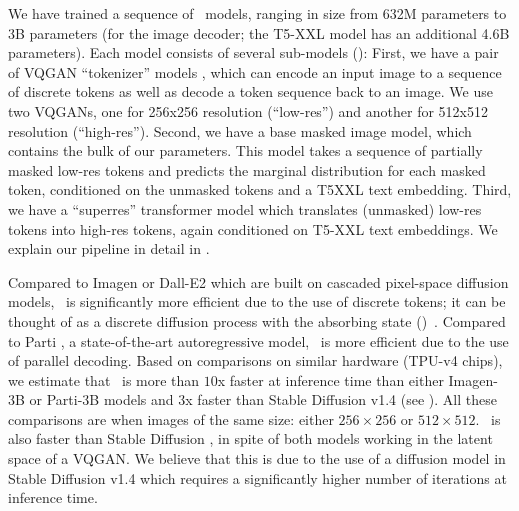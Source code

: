 We have trained a sequence of \name~models, ranging in size from 632M parameters to 3B parameters (for the image decoder; the T5-XXL model has an additional 4.6B parameters). Each model consists of several sub-models ():
First, we have a pair of VQGAN ``tokenizer'' models \citep{esser2021taming}, which can encode an input image to a sequence of discrete tokens as well as decode a token sequence back to an image. We use two VQGANs, one for 256x256 resolution (``low-res'') and another for 512x512 resolution (``high-res''). Second, we have a base masked image model, which contains the bulk of our parameters. This model takes a sequence of partially masked low-res tokens and predicts the marginal distribution for each masked token, conditioned on the unmasked tokens and a T5XXL text embedding. Third, we have a ``superres'' transformer model which translates (unmasked) low-res tokens into high-res tokens, again conditioned on T5-XXL text embeddings. We explain our pipeline in detail in .


Compared to Imagen \citep{imagen} or Dall-E2 \citep{dalle2} which are built on cascaded pixel-space diffusion models, \name~is significantly more efficient due to the use of discrete tokens; it can be thought of as a discrete diffusion process with the absorbing state (\mask)~\citep{austin2021structured}. Compared to Parti \citep{parti}, a state-of-the-art autoregressive model, \name~is more efficient due to the use of parallel decoding.
Based on comparisons on similar hardware (TPU-v4 chips), we estimate that \name~is more than $10$x faster at inference time than either Imagen-3B or Parti-3B models and $3$x faster than Stable Diffusion v1.4 \citep{ldm} (see ). All these comparisons are when images of the same size: either $256\times256$ or $512\times512$. \name~is also faster than Stable Diffusion \citep{ldm}, in spite of both models working in the latent space of a VQGAN. We believe that this is due to the use of a diffusion model in Stable Diffusion v1.4 which requires a significantly higher number of iterations at inference time.

